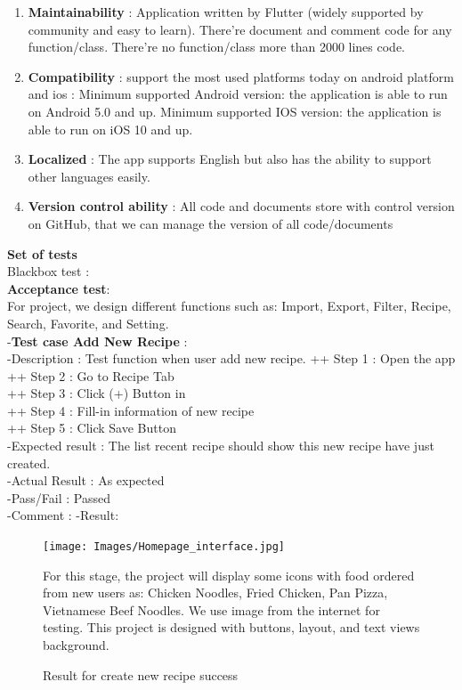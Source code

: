 \documentclass{article}
\begin{document}
\begin{enumerate}
        \item \textbf{Maintainability} : Application written by Flutter (widely supported by community and easy to learn). There’re document and comment code for any function/class. There’re no function/class more than 2000 lines code. 
        \item \textbf{Compatibility} : support the most used platforms today on android platform and ios :  Minimum supported Android version: the application is able to run on Android 5.0 and up.  Minimum supported IOS version: the application is able to run on iOS 10 and up. 
        \item \textbf{Localized} : The app supports English but also has the ability to support other languages easily. 
        \item \textbf{Version control ability} : All code and documents store with control version on GitHub, that we can manage the version of all code/documents 
    \end{enumerate}

\textbf{Set of tests} \\

Blackbox test :   \\
\textbf{Acceptance test}: \\
    For project, we design different functions such as: Import, Export, Filter, Recipe, Search, Favorite, and Setting. \\

-\textbf{Test case Add New Recipe }: \\
    -Description : Test function when user add new recipe.
    ++ Step 1 : Open the app  \\
    ++ Step 2 : Go to Recipe Tab \\
    ++ Step 3 : Click (+) Button in  \\
    ++ Step 4 : Fill-in information of new recipe \\
    ++ Step 5 : Click Save Button \\
    -Expected result : The list recent recipe should show this new recipe have just created. \\
    -Actual Result : As expected \\
    -Pass/Fail : Passed \\
    -Comment : 
    -Result:
    \begin{figure}[h!]
    \centering
    \texttt{[image: Images/Homepage\_interface.jpg]}
    \caption{Result for create new recipe success}
    \label{fig:cookingbook}
    For this stage, the project will display some icons with food ordered from new users as: Chicken Noodles, Fried Chicken, Pan Pizza, Vietnamese Beef Noodles. We use image from the internet for testing. This project is designed with buttons, layout, and text views background.
    \end{figure}
\end{document}
